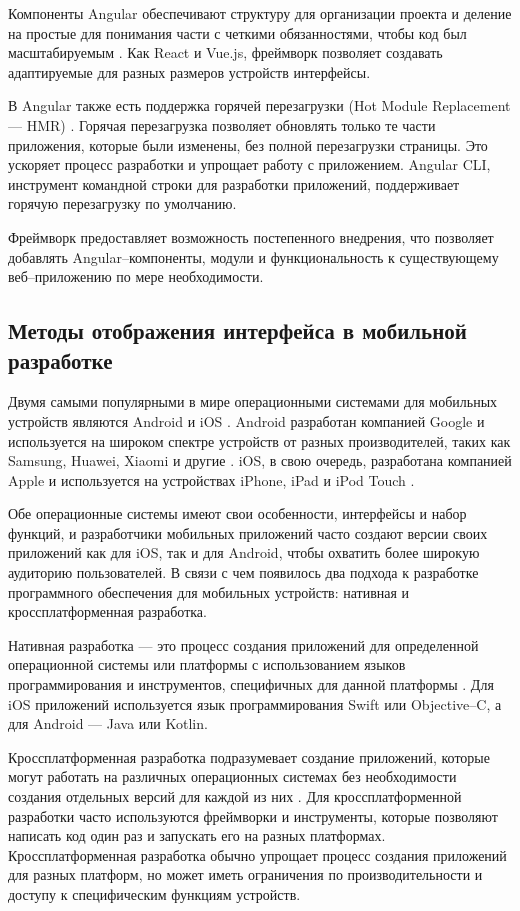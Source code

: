 Компоненты Angular обеспечивают структуру для организации проекта и деление на простые для понимания части с четкими обязанностями, чтобы код был масштабируемым \cite{angular-components}.
Как React и Vue.js, фреймворк позволяет создавать адаптируемые для разных размеров устройств интерфейсы.

В Angular также есть поддержка горячей перезагрузки (Hot Module Replacement --- HMR) \cite{angular-hmr}. 
Горячая перезагрузка позволяет обновлять только те части приложения, которые были изменены, без полной перезагрузки страницы. 
Это ускоряет процесс разработки и упрощает работу с приложением.
Angular CLI, инструмент командной строки для разработки приложений, поддерживает горячую перезагрузку по умолчанию.

Фреймворк предоставляет возможность постепенного внедрения, что позволяет добавлять Angular--компоненты, модули и функциональность к существующему веб--приложению по мере необходимости.


\subsection{Методы отображения интерфейса в мобильной разработке} 

Двумя самыми популярными в мире операционными системами для мобильных устройств являются Android и iOS \cite{mob-os-stat}. 
Android разработан компанией Google и используется на широком спектре устройств от разных производителей, таких как Samsung, Huawei, Xiaomi и другие \cite{android}.
iOS, в свою очередь, разработана компанией Apple и используется на устройствах iPhone, iPad и iPod Touch \cite{ios}. 

Обе операционные системы имеют свои особенности, интерфейсы и набор функций, и разработчики мобильных приложений часто создают версии своих приложений как для iOS, так и для Android, чтобы охватить более широкую аудиторию пользователей. 
В связи с чем появилось два подхода к разработке программного обеспечения для мобильных устройств: нативная и кроссплатформенная разработка. 

Нативная разработка --- это процесс создания приложений для определенной операционной системы или платформы с использованием языков программирования и инструментов, специфичных для данной платформы \cite{native-crossplatform}. 
Для iOS приложений используется язык программирования Swift или Objective--C, а для Android --- Java или Kotlin.

Кроссплатформенная разработка подразумевает создание приложений, которые могут работать на различных операционных системах без необходимости создания отдельных версий для каждой из них \cite{native-crossplatform}. 
Для кроссплатформенной разработки часто используются фреймворки и инструменты, которые позволяют написать код один раз и запускать его на разных платформах. 
Кроссплатформенная разработка обычно упрощает процесс создания приложений для разных платформ, но может иметь ограничения по производительности и доступу к специфическим функциям устройств.

